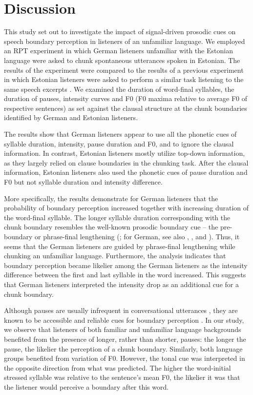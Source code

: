 \documentclass[output=paper]{langscibook}
\begin{document}
    \section{Discussion}
    
    This study set out to investigate the impact of signal-driven prosodic cues on speech boundary perception in listeners of an unfamiliar language. We employed an RPT experiment in which German listeners unfamiliar with the Estonian language were asked to chunk spontaneous utterances spoken in Estonian. The results of the experiment were compared to the results of a previous experiment in which Estonian listeners were asked to perform a similar task listening to the same speech excerpts \citep[][]{otsTaremaaOpli2022}. We examined the duration of word-final syllables, the duration of pauses, intensity curves and F0 (F0 maxima relative to average F0 of respective sentences) as set against the clausal structure at the chunk boundaries identified by German and Estonian listeners.

    The results show that German listeners appear to use all the phonetic cues of syllable duration, intensity, pause duration and F0, and to ignore the clausal information. In contrast, Estonian listeners mostly utilize top-down information, as they largely relied on clause boundaries in the chunking task. After the clausal information, Estonian listeners also used the phonetic cues of pause duration and F0 but not syllable duration and intensity difference.

    More specifically, the results demonstrate for German listeners that the probability of boundary perception increased together with increasing duration of the word-final syllable. The longer syllable duration corresponding with the chunk boundary resembles the well-known prosodic boundary cue  --  the pre-boundary or phrase-final lengthening (\citealt{berkovits1994, Fon2011, Nakai2009, petroneEtAl2017, Wightman1992}; for German, see also , , and ). Thus, it seems that the German listeners are guided by phrase-final lengthening while chunking an unfamiliar language. Furthermore, the analysis indicates that boundary perception became likelier among the German listeners as the intensity difference between the first and last syllable in the word increased. This suggests that German listeners interpreted the intensity drop as an additional cue for a chunk boundary.

    Although pauses are usually infrequent in conversational utterances \citep[][]{bironEtAl2021}, they are known to be accessible and reliable cues for boundary perception \citep[][]{himmelmannEtAl2018, riesbergEtAl2020, petroneEtAl2017}. In our study, we observe that listeners of both familiar and unfamiliar language backgrounds benefited from the presence of longer, rather than shorter, pauses: the longer the pause, the likelier the perception of a chunk boundary. Similarly, both language groups benefited from variation of F0. However, the tonal cue was interpreted in the opposite direction from what was predicted. The higher the word-initial stressed syllable was relative to the sentence’s mean F0, the likelier it was that the listener would perceive a boundary after this word.
\end{document}
